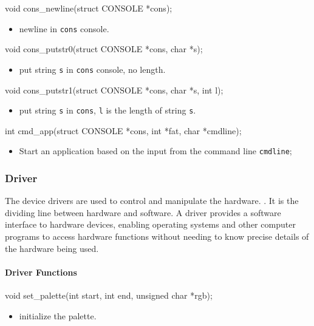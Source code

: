 \documentclass{swfcthesis}
\begin{document}
\begin{ccode}
void cons_newline(struct CONSOLE *cons);
\end{ccode}
\begin{itemize}
\item newline in \texttt{cons} console.
\end{itemize}

\begin{ccode}
void cons_putstr0(struct CONSOLE *cons, char *s);
\end{ccode}
\begin{itemize}
\item put string \texttt{s} in \texttt{cons} console, no length.
\end{itemize}

\begin{ccode}
void cons_putstr1(struct CONSOLE *cons, char *s, int l);
\end{ccode}
\begin{itemize}
\item put string \texttt{s} in \texttt{cons}, \texttt{l} is the length of string
  \texttt{s}.
\end{itemize}

\begin{ccode}
int cmd_app(struct CONSOLE *cons, int *fat, char *cmdline);
\end{ccode}
\begin{itemize}
\item Start an application based on the input from the command line \texttt{cmdline};
\end{itemize}

\subsubsection{Driver}
\label{sec:driver}

The device drivers are used to control and manipulate the
hardware. . It is the
dividing line between hardware and software. A driver provides a software interface to
hardware devices, enabling operating systems and other computer programs to access
hardware functions without needing to know precise details of the hardware being used.

\paragraph{Driver Functions}

\begin{ccode}
void set_palette(int start, int end, unsigned char *rgb);
\end{ccode}
\begin{itemize}
\item initialize the palette.
\end{itemize}
\end{document}
